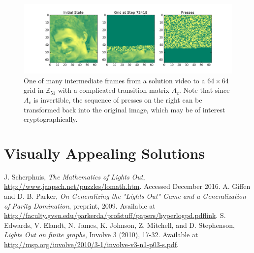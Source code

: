 \documentclass[11pt]{article}
\newcommand{\modZ}[1]{$\mathbb{Z}_{#1}$}
\begin{document}
\begin{figure}
  \caption{One of many intermediate frames from a solution video to a $64 \times 64$ grid in \modZ{51} with a complicated transition matrix $A_c$. Note that since $A_c$ is invertible, the sequence of presses on the right can be transformed back into the original image, which may be of interest cryptographically.}
  \label{chr-solution}
  \includegraphics[width=\textwidth]{img000072418.png}
\end{figure}

\section*{Visually Appealing Solutions}

\clearpage

\begin{thebibliography}{9}
  J. Scherphuis, \textit{The Mathematics of Lights Out},
  \href{http://www.jaapsch.net/puzzles/lomath.htm}{http://www.jaapsch.net/puzzles/lomath.htm}.
  Accessed December 2016.
  A. Giffen and D. B. Parker, \textit{On Generalizing the "Lights Out" Game and a Generalization of Parity Domination}, preprint, 2009. Available at \href{http://faculty.gvsu.edu/parkerda/profstuff/papers/hyperlogpd.pdf}{http://faculty.gvsu.edu/parkerda/profstuff/papers/hyperlogpd.pdflink}.
  S. Edwards, V. Elandt, N. James, K. Johnson, Z. Mitchell, and D. Stephenson, \textit{Lights Out on finite graphs}, Involve 3 (2010), 17-32. Available at \href{http://msp.org/involve/2010/3-1/involve-v3-n1-p03-s.pdf}{http://msp.org/involve/2010/3-1/involve-v3-n1-p03-s.pdf}.
\end{thebibliography}
\end{document}
